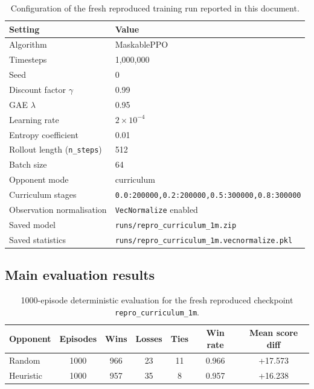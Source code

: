 \documentclass[10pt]{article}
\begin{document}
\begin{table}[H]
\centering
\begin{tabularx}{\textwidth}{@{}lY@{}}
\toprule
Setting & Value \\
\midrule
Algorithm & MaskablePPO \\
Timesteps & 1,000,000 \\
Seed & 0 \\
Discount factor \(\gamma\) & 0.99 \\
GAE \(\lambda\) & 0.95 \\
Learning rate & \(2 \times 10^{-4}\) \\
Entropy coefficient & 0.01 \\
Rollout length (\texttt{n\_steps}) & 512 \\
Batch size & 64 \\
Opponent mode & curriculum \\
Curriculum stages & \texttt{0.0:200000,0.2:200000,0.5:300000,0.8:300000} \\
Observation normalisation & \texttt{VecNormalize} enabled \\
Saved model & \texttt{runs/repro\_curriculum\_1m.zip} \\
Saved statistics & \texttt{runs/repro\_curriculum\_1m.vecnormalize.pkl} \\
\bottomrule
\end{tabularx}
\caption{Configuration of the fresh reproduced training run reported in this document.}
\label{tab:training-config}
\end{table}

\subsection{Main evaluation results}

\begin{table}[H]
\centering
\begin{tabularx}{\textwidth}{@{}lcccccc@{}}
\toprule
Opponent & Episodes & Wins & Losses & Ties & Win rate & Mean score diff \\
\midrule
Random & 1000 & 966 & 23 & 11 & 0.966 & +17.573 \\
Heuristic & 1000 & 957 & 35 & 8 & 0.957 & +16.238 \\
\bottomrule
\end{tabularx}
\caption{1000-episode deterministic evaluation for the fresh reproduced checkpoint \texttt{repro\_curriculum\_1m}.}
\label{tab:main-results}
\end{table}
\end{document}
